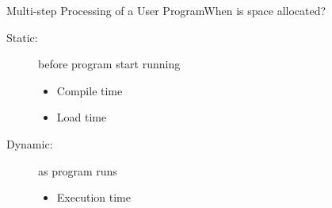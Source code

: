 \begin{frame}{Multi-step Processing of a User Program}{When is space
    allocated?}
  \begin{minipage}{.37\textwidth}
    \centering
    \label{reg}
  \end{minipage}\quad
  \begin{minipage}{.55\textwidth}
    \begin{description}
    \item[Static:] before program start running
      \begin{itemize}
      \item Compile time
      \item Load time
      \end{itemize}
    \item[Dynamic:] as program runs
      \begin{itemize}
      \item Execution time
      \end{itemize}
    \end{description}
  \end{minipage}
\end{frame}

